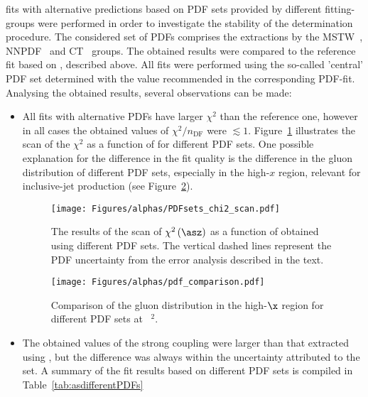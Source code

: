 \asz fits with alternative predictions based on PDF sets provided by different fitting-groups were performed in order to investigate the stability of the \asz determination procedure. The considered set of PDFs comprises the extractions by the MSTW~\cite{Martin:2009iq}, NNPDF~\cite{Ball:2012cx} and CT~\cite{Gao:2013xoa} groups. The obtained results were compared to the reference fit based on , described above. All fits were performed using the so-called 'central' PDF set determined with the \asz value recommended in the corresponding PDF-fit. Analysing the obtained results, several observations can be made:
\begin{itemize}
 \item All fits with alternative PDFs have larger $\chi^2$ than the reference one, however in all cases the obtained values of $\chi^2/n_\text{DF}$ were $\lesssim 1$. Figure~\ref{fig:chi2scanpdf} illustrates the scan of the $\chi^2$ as a function of \asz for different PDF sets. One possible explanation for the difference in the fit quality is the difference in the gluon distribution of different PDF sets, especially in the high-$x$ region, relevant for inclusive-jet production (see Figure~\ref{fig:pdf_gluon_comp}).
\begin{figure}[t]
 \centering
 \texttt{[image: Figures/alphas/PDFsets\_chi2\_scan.pdf]}
 \caption{The results of the scan of $\chi^2\left(\asz\right)$ as a function of \asz obtained using different PDF sets. The vertical dashed lines represent the PDF uncertainty from the  error analysis described in the text.}
 \label{fig:chi2scanpdf}
\end{figure}
\begin{figure}[ht]
 \centering
 \texttt{[image: Figures/alphas/pdf\_comparison.pdf]}
 \caption{Comparison of the gluon distribution in the high-$\x$ region for different PDF sets at ~\GeV$^2$.}
 \label{fig:pdf_gluon_comp}
\end{figure}
 \item The obtained values of the strong coupling were larger than that extracted using , but the difference was always within the uncertainty attributed to the  set. A summary of the fit results based on different PDF sets is compiled in Table~\ref{tab:asdifferentPDFs}
\end{itemize}


